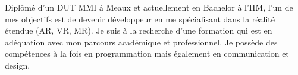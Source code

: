 

\begin{cvparagraph}

 Diplômé d'un DUT MMI à Meaux et actuellement en Bachelor à l'IIM, %
l'un de mes objectifs est de devenir développeur en me spécialisant dans la réalité étendue (AR, VR, MR). %
Je suis à la recherche d'une formation qui est en adéquation avec mon parcours académique et professionnel. 
Je possède des compétences à la fois en programmation mais également en communication et design.
\end{cvparagraph}